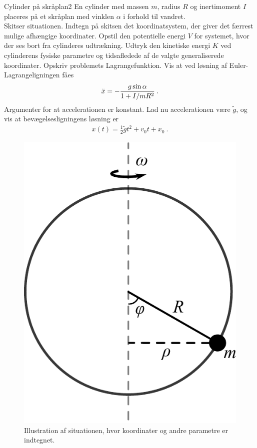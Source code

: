 \begin{opgave}{Cylinder på skråplan}{2}\label{opg:cylinder}
En cylinder med massen $m$, radius $R$ og inertimoment $I$ placeres på et skråplan med vinklen $\alpha$ i forhold til vandret.\\
\opg Skitser situationen.
\opg Indtegn på skitsen det koordinatsystem, der giver det færrest mulige afhængige koordinater.
\opg Opstil den potentielle energi $V$ for systemet, hvor der ses bort fra cylinderes udtrækning.
\opg Udtryk den kinetiske energi $K$ ved cylinderens fysiske parametre og tidsafledede af de valgte generaliserede koordinater.
\opg Opskriv problemets Lagrangefunktion.
\opg Vis at ved løsning af Euler-Lagrangeligningen fåes
\begin{align*}
\ddot{x} = -\dfrac{g\sin\alpha}{1+I/mR^2} \: .
\end{align*}
\opg Argumenter for at accelerationen er konstant.
\opg Lad nu accelerationen være $\tilde{g}$, og vis at bevægelsesligningens løsning er
\begin{align*}
x(t) = \frac{1}{2}\tilde{g}t^2 + v_0t + x_0 \: .
\end{align*}
\end{opgave}
%
%
\begin{figure}[h!]
	\centering
	\includegraphics[width=.65\columnwidth]{Analytisk-Mekanik/BeadOnHoop.pdf}
	\caption{Illustration af situationen, hvor koordinater og andre parametre er indtegnet.} \label{fig:BeadOnHoop}
\end{figure}
%
%
\newpage

